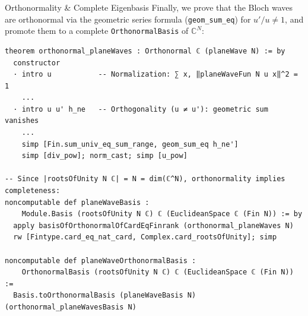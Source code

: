 \documentclass[aspectratio=169, 10pt]{beamer}
\begin{document}
\begin{frame}[fragile]{Orthonormality \& Complete Eigenbasis}
  Finally, we prove that the Bloch waves are orthonormal via the geometric series formula (\texttt{geom\_sum\_eq}) for $u' / u \neq 1$, and promote them to a complete \texttt{OrthonormalBasis} of $\mathbb{C}^N$:

  \vspace{0.05cm}
\begin{lstlisting}[language=Lean4]
theorem orthonormal_planeWaves : Orthonormal ℂ (planeWave N) := by
  constructor
  · intro u           -- Normalization: ∑ x, ‖planeWaveFun N u x‖^2 = 1
    ...
  · intro u u' h_ne   -- Orthogonality (u ≠ u'): geometric sum vanishes
    ...
    simp [Fin.sum_univ_eq_sum_range, geom_sum_eq h_ne']
    simp [div_pow]; norm_cast; simp [u_pow]

-- Since |rootsOfUnity N ℂ| = N = dim(ℂ^N), orthonormality implies completeness:
noncomputable def planeWaveBasis :
    Module.Basis (rootsOfUnity N ℂ) ℂ (EuclideanSpace ℂ (Fin N)) := by
  apply basisOfOrthonormalOfCardEqFinrank (orthonormal_planeWaves N)
  rw [Fintype.card_eq_nat_card, Complex.card_rootsOfUnity]; simp

noncomputable def planeWaveOrthonormalBasis :
    OrthonormalBasis (rootsOfUnity N ℂ) ℂ (EuclideanSpace ℂ (Fin N)) :=
  Basis.toOrthonormalBasis (planeWaveBasis N) (orthonormal_planeWavesBasis N)
\end{lstlisting}
\end{frame}
\end{document}
